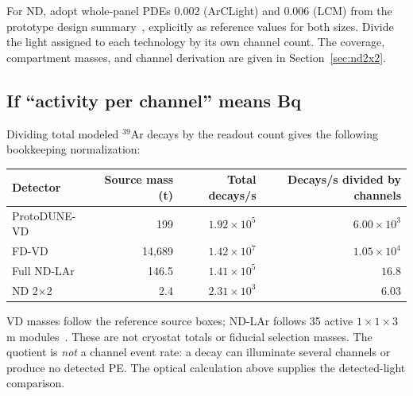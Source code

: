 For ND, adopt whole-panel PDEs 0.002 (ArCLight) and 0.006 (LCM) from the
prototype design summary~\cite{nd_status}, explicitly as reference values
for both sizes. Divide the light assigned to each technology by its own
channel count. The coverage, compartment masses, and channel derivation
are given in Section~\ref{sec:nd2x2}.

\subsection{If ``activity per channel'' means Bq}

Dividing total modeled $^{39}$Ar decays by the readout count gives the
following bookkeeping normalization:
\begin{center}
\small
\begin{tabular}{lrrr}
\toprule
Detector & Source mass (t) & Total decays/s & Decays/s divided by channels \\
\midrule
ProtoDUNE-VD & 199 & $1.92\times10^5$ & $6.00\times10^3$ \\
FD-VD & 14,689 & $1.42\times10^7$ & $1.05\times10^4$ \\
Full ND-LAr & 146.5 & $1.41\times10^5$ & $16.8$ \\
ND 2$\times$2 & 2.4 & $2.31\times10^3$ & $6.03$ \\
\bottomrule
\end{tabular}
\end{center}
VD masses follow the reference source boxes; ND-LAr follows 35 active
$1\times1\times3$ m modules~\cite{nd_cdr}. These are not cryostat totals
or fiducial selection masses. The quotient is \emph{not} a channel event
rate: a decay can illuminate several channels or produce no detected PE.
The optical calculation above supplies the detected-light comparison.

\clearpage
